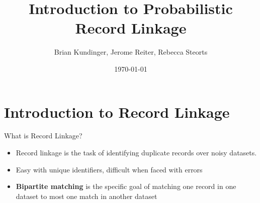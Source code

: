 \documentclass{beamer}
\begin{document}
	\title{Introduction to Probabilistic Record Linkage}
	\author{Brian Kundinger, Jerome Reiter, Rebecca Steorts}
	\date{\today}
	

	
	\begin{frame}
		\titlepage
	\end{frame}


\section{Introduction to Record Linkage}

	\begin{frame}{What is Record Linkage?}
	\begin{itemize}
		\item Record linkage is the task of identifying duplicate records over noisy datasets.
		
		\item Easy with unique identifiers, difficult when faced with errors
		
		\item \textbf{Bipartite matching} is the specific goal of matching one record in one dataset to most one match in another dataset
	\end{itemize}
	\end{frame}


%			
\end{document}
